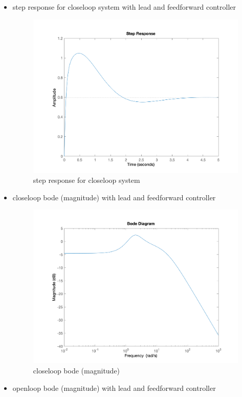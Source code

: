 \begin{itemize}
\begin{figure}[H]
	\end{figure}
	\item step response for closeloop system with lead and feedforward controller
	\begin{figure}[H]
		\caption{step response for closeloop system}
		\centering
		\includegraphics[width=12cm]{../Figure/Q1/Q1_c/feedback_step.png}
	\end{figure}
	\item closeloop bode (magnitude) with lead and feedforward controller
	\begin{figure}[H]
		\caption{closeloop bode (magnitude)}
		\centering
		\includegraphics[width=12cm]{../Figure/Q1/Q1_c/feedback_bode.png}
	\end{figure}
	\item openloop bode (magnitude) with lead and feedforward controller
	\begin{figure}[H]

\end{figure}
\end{itemize}
